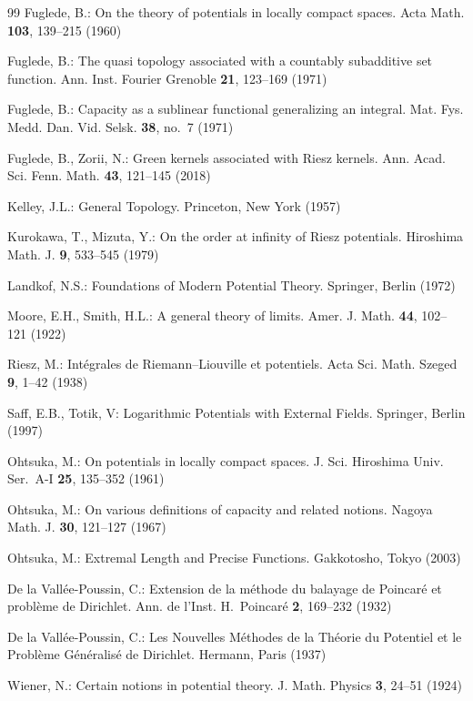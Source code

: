 \documentclass[12pt,a4paper,reqno]{amsart} %
\theoremstyle{lause}
\theoremstyle{maaritelma}
\theoremstyle{lause}
\theoremstyle{maaritelma}
\numberwithin{equation}{section}
\begin{document}
\begin{thebibliography}{99}
 Fuglede, B.: On the theory of potentials in locally compact spaces. Acta Math. {\bf 103}, 139--215  (1960)

 Fuglede, B.: The quasi topology associated with a countably subadditive set function. Ann. Inst. Fourier Grenoble {\bf 21}, 123--169 (1971)

 Fuglede, B.: Capacity as a sublinear functional generalizing an integral. Mat. Fys. Medd. Dan. Vid. Selsk. {\bf 38}, no.~7 (1971)

 Fuglede, B., Zorii, N.: Green kernels associated with Riesz kernels. Ann. Acad. Sci. Fenn. Math. {\bf 43}, 121--145 (2018)

Kelley, J.L.: General Topology. Princeton, New York (1957)

 Kurokawa, T., Mizuta, Y.: On the order at infinity of Riesz potentials. Hiroshima Math. J. {\bf 9}, 533--545 (1979)

 Landkof, N.S.: Foundations of Modern Potential Theory. Springer, Berlin (1972)

 Moore, E.H., Smith, H.L.: A general theory of limits. Amer. J. Math. {\bf 44}, 102--121 (1922)

 Riesz, M.: Int\'{e}grales de Riemann--Liouville et potentiels. Acta Sci. Math. Szeged {\bf 9}, 1--42 (1938)

 Saff, E.B., Totik, V: Logarithmic Potentials with External Fields. Springer, Berlin (1997)

 Ohtsuka, M.: On potentials in locally compact spaces. J. Sci. Hiroshima Univ. Ser.\ A-I {\bf 25}, 135--352 (1961)

 Ohtsuka, M.: On various definitions of capacity and related notions. Nagoya Math. J. {\bf 30}, 121--127 (1967)

 Ohtsuka, M.: Extremal Length and Precise Functions. Gakkotosho, Tokyo (2003)

 De la Vall\'{e}e-Poussin, C.:   Extension de la méthode du balayage de Poincaré et problème de Dirichlet. Ann. de l'Inst. H.~Poincar\'{e} {\bf 2}, 169--232 (1932)

 De la Vall\'{e}e-Poussin, C.: Les Nouvelles M\'{e}thodes de la Th\'{e}orie du Potentiel et le Probl\`{e}me G\'{e}n\'{e}ralis\'{e} de Dirichlet. Hermann, Paris (1937)

 Wiener, N.: Certain notions in potential theory. J. Math. Physics {\bf 3}, 24--51 (1924)


\end{thebibliography}
\end{document}
